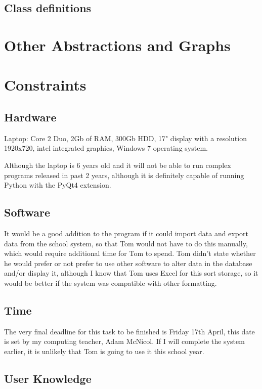 \begin{algorithm}[H]
\subsection{Class definitions}

\section{Other Abstractions and Graphs}

\section{Constraints}

\subsection{Hardware}
Laptop: Core 2 Duo, 2Gb of RAM, 300Gb HDD, 17" display with a resolution 1920x720, intel integrated graphics, Windows 7 operating system.

Although the laptop is 6 years old and it will not be able to run complex programs released in past 2 years, although it is definitely capable of running Python with the PyQt4 extension.

\subsection{Software}

It would be a good addition to the program if it could import data and export data from the school system, so that Tom would not have to do this manually, which would require additional time for Tom to spend. Tom didn't state whether he would prefer or not prefer to use other software to alter data in the database and/or display it, although I know that Tom uses Excel for this sort storage, so it would be better if the system was compatible with other formatting.


\subsection{Time}
The very final deadline for this task to be finished is Friday 17th April, this date is set by my computing teacher, Adam McNicol. If I will complete the system earlier, it is unlikely that Tom is going to use it this school year. 

\subsection{User Knowledge}


\end{algorithm}
